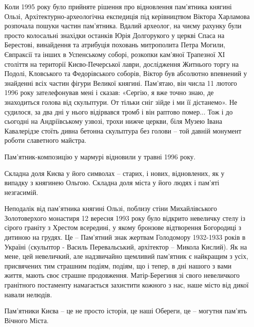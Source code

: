 Коли 1995 року було прийняте рішення про відновлення пам'ятника княгині Ользі,
Архітектурно-археологічна експедиція під керівництвом Віктора Харламова
розпочала пошуки частин пам'ятника. Вдалий археолог, на чиєму рахунку були
просто колосальні знахідки останків Юрія Долгорукого у церкві Спаса на
Берестові, винайдення та атрибуція поховань митрополита Петра Могили, Євпраксії
та інших в Успенському соборі, розкопки кам'яної Трапезної ХІ століття на
території Києво-Печерської лаври, дослідження Житнього торгу на Подолі,
Кловського та Федорівського соборів, Віктор був абсолютно впевнений у знайденні
всіх частин фігури Великої княгині. Пам'ятаю, він  числа 11 лютого 1996 року
зателефонував мені і сказав: «Сергію, я вже точно знаю, де знаходиться голова
від скульптури. От тільки сніг зійде і ми її дістанемо». Не судилося, за два
дні у нього відірвався тромб і він раптово помер... Тож і до сьогодні на
Андріївському узвозі, трохи нижче церкви, біля Музею Івана Кавалерідзе стоїть
дивна бетонна скульптура без голови – той давній монумент роботи славетного
майстра.

Пам'ятник-композицію у мармурі відновили у травні 1996 року.

Складна доля Києва у його символах – старих, і нових, відновлених, як у випадку
з княгинею Ольгою. Складна доля міста у його людях і пам'яті незгасимій.

Неподалік від пам'ятника княгині Ользі, поблизу стіни Михайлівського
Золотоверхого монастиря 12 вересня 1993 року було відкрито невеличку стелу із
сірого граніту з Хрестом всередині, у якому бронзове відтворення Богородиці з
дитиною на грудях. Це – Пам'ятний знак жертвам Голодомору 1932-1933 років в
Україні (скульптор - Василь Перевальський, архітектор – Микола Кислий). Як на
мене, цей невеличкий, але надзвичайно щемливий пам'ятник є найкращим з усіх,
присвячених тим страшним подіям, подіям, що і тепер, в дні нашого з вами життя,
мають своє страшне продовження. Матір-Берегиня зі свого невеличкого гранітного
постаменту намагається захистити кожного з нас, наше місто від дикої навали
нелюдів.

Пам'ятники Києва – це не просто історія, це наші Обереги, це – могутня пам'ять
Вічного Міста.
